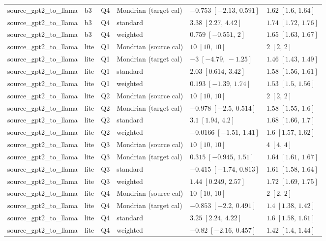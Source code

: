\begin{longtable}{@{}p{}p{}p{}p{}p{}p{}@{}}
source\_gpt2\_to\_llama & b3 & Q4 & Mondrian (target cal) & $-0.753\;[-2.13,\,0.591]$ & $1.62\;[1.6,\,1.64]$ \\
source\_gpt2\_to\_llama & b3 & Q4 & standard & $3.38\;[2.27,\,4.42]$ & $1.74\;[1.72,\,1.76]$ \\
source\_gpt2\_to\_llama & b3 & Q4 & weighted & $0.759\;[-0.551,\,2]$ & $1.65\;[1.63,\,1.67]$ \\
source\_gpt2\_to\_llama & lite & Q1 & Mondrian (source cal) & $10\;[10,\,10]$ & $2\;[2,\,2]$ \\
source\_gpt2\_to\_llama & lite & Q1 & Mondrian (target cal) & $-3\;[-4.79,\,-1.25]$ & $1.46\;[1.43,\,1.49]$ \\
source\_gpt2\_to\_llama & lite & Q1 & standard & $2.03\;[0.614,\,3.42]$ & $1.58\;[1.56,\,1.61]$ \\
source\_gpt2\_to\_llama & lite & Q1 & weighted & $0.193\;[-1.39,\,1.74]$ & $1.53\;[1.5,\,1.56]$ \\
source\_gpt2\_to\_llama & lite & Q2 & Mondrian (source cal) & $10\;[10,\,10]$ & $2\;[2,\,2]$ \\
source\_gpt2\_to\_llama & lite & Q2 & Mondrian (target cal) & $-0.978\;[-2.5,\,0.514]$ & $1.58\;[1.55,\,1.6]$ \\
source\_gpt2\_to\_llama & lite & Q2 & standard & $3.1\;[1.94,\,4.2]$ & $1.68\;[1.66,\,1.7]$ \\
source\_gpt2\_to\_llama & lite & Q2 & weighted & $-0.0166\;[-1.51,\,1.41]$ & $1.6\;[1.57,\,1.62]$ \\
source\_gpt2\_to\_llama & lite & Q3 & Mondrian (source cal) & $10\;[10,\,10]$ & $4\;[4,\,4]$ \\
source\_gpt2\_to\_llama & lite & Q3 & Mondrian (target cal) & $0.315\;[-0.945,\,1.51]$ & $1.64\;[1.61,\,1.67]$ \\
source\_gpt2\_to\_llama & lite & Q3 & standard & $-0.415\;[-1.74,\,0.813]$ & $1.61\;[1.58,\,1.64]$ \\
source\_gpt2\_to\_llama & lite & Q3 & weighted & $1.44\;[0.249,\,2.57]$ & $1.72\;[1.69,\,1.75]$ \\
source\_gpt2\_to\_llama & lite & Q4 & Mondrian (source cal) & $10\;[10,\,10]$ & $2\;[2,\,2]$ \\
source\_gpt2\_to\_llama & lite & Q4 & Mondrian (target cal) & $-0.853\;[-2.2,\,0.491]$ & $1.4\;[1.38,\,1.42]$ \\
source\_gpt2\_to\_llama & lite & Q4 & standard & $3.25\;[2.24,\,4.22]$ & $1.6\;[1.58,\,1.61]$ \\
source\_gpt2\_to\_llama & lite & Q4 & weighted & $-0.82\;[-2.16,\,0.457]$ & $1.42\;[1.4,\,1.44]$ \\

\end{longtable}

